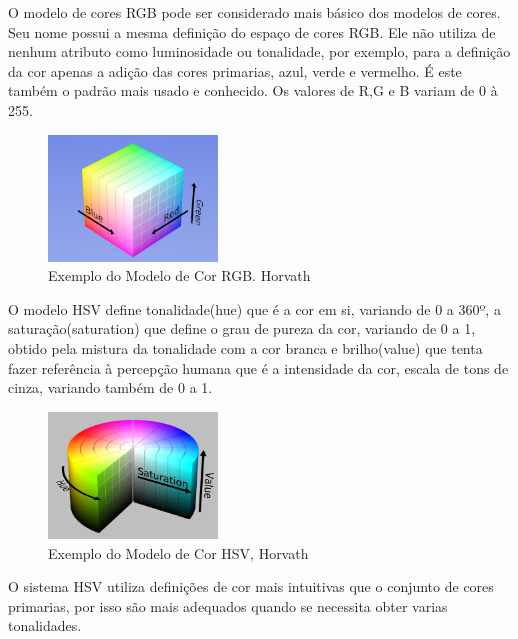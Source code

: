 O modelo de cores RGB pode ser considerado mais básico dos modelos de cores. Seu nome possui a mesma definição do espaço de cores RGB. Ele não utiliza de nenhum atributo como luminosidade ou tonalidade, por exemplo, para a definição da cor apenas a adição das cores primarias, azul, verde e vermelho. É este também o padrão mais usado e conhecido. Os valores de R,G e B variam de 0 à 255.


\begin{figure}[!h]
	\centering
	\includegraphics[width=0.4\textwidth]{rgb.pdf}
	
\caption{Exemplo do Modelo de Cor RGB.	 Horvath\cite{ImagensHSLHSVRGB}  }
	\label{ModeloRGB}
\end{figure}



O modelo HSV define tonalidade(hue) que é a cor em si, variando de 0 a 360º, a saturação(saturation) que define o grau de pureza da cor, variando de 0 a 1, obtido pela mistura da tonalidade com a cor branca e brilho(value) que tenta fazer referência à percepção humana\cite{Leao:2005} que é a intensidade da cor, escala de tons de cinza\cite{Azevedo:2003}, variando também de 0 a 1.


\begin{figure}[!h]
	\centering
	\includegraphics[width=0.4\textwidth]{hsv.pdf}
	
	\caption{Exemplo do Modelo de Cor HSV, Horvath\cite{ImagensHSLHSVRGB}}
	\label{ModeloHSV}
\end{figure} 


O sistema HSV utiliza definições de cor mais intuitivas que o conjunto de cores primarias, por isso são mais adequados quando se necessita obter varias tonalidades.

